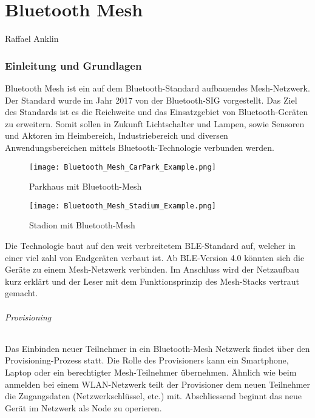 \vspace*{4cm}
\part{Bluetooth Mesh}\label{part:BluetoothMesh}
Raffael Anklin
\vspace*{\fill}
\clearpage

\section{Einleitung und Grundlagen}\label{sec:EinleitungBluetooth}


Bluetooth Mesh ist ein auf dem Bluetooth-Standard aufbauendes Mesh-Netzwerk. Der Standard wurde im Jahr 2017 von der Bluetooth-SIG vorgestellt. Das Ziel des Standards ist es die Reichweite und das Einsatzgebiet von Bluetooth-Geräten zu erweitern. Somit sollen in Zukunft Lichtschalter und Lampen, sowie Sensoren und Aktoren im Heimbereich, Industriebereich und diversen Anwendungsbereichen mittels Bluetooth-Technologie verbunden werden.

\begin{figure}[!htbp]
	\begin{minipage}{0.49\textwidth}
		\centering
		\texttt{[image: Bluetooth\_Mesh\_CarPark\_Example.png]}
		\caption[Parkhaus mit Bluetooth-Mesh]{Parkhaus mit Bluetooth-Mesh \cite{bluetooth_sig_mesh-technology-overviewpdf_2020}}
		\label{fig:BluetoothMeshParkingExample}
	\end{minipage}
	\begin{minipage}{0.49\textwidth}
		\centering
		\texttt{[image: Bluetooth\_Mesh\_Stadium\_Example.png]}
		\caption[Stadion mit Bluetooth-Mesh]{Stadion mit Bluetooth-Mesh \cite{bluetooth_sig_mesh-technology-overviewpdf_2020}}
		\label{fig:BluetoothMeshStadiumExample}
	\end{minipage}
\end{figure}


Die Technologie baut auf den weit verbreitetem BLE-Standard auf, welcher in einer viel zahl von Endgeräten verbaut ist. Ab BLE-Version 4.0 könnten sich die Geräte zu einem Mesh-Netzwerk verbinden. Im Anschluss wird der Netzaufbau kurz erklärt und der Leser mit dem Funktionsprinzip des Mesh-Stacks vertraut gemacht.

\paragraph{Provisioning}
Das Einbinden neuer Teilnehmer in ein Bluetooth-Mesh Netzwerk findet über den Provisioning-Prozess statt. Die Rolle des Provisioners kann ein Smartphone, Laptop oder ein berechtigter Mesh-Teilnehmer übernehmen. Ähnlich wie beim anmelden bei einem WLAN-Netzwerk teilt der Provisioner dem neuen Teilnehmer die Zugangsdaten (Netzwerkschlüssel, etc.) mit. Abschliessend beginnt das neue Gerät im Netzwerk als Node zu operieren.

